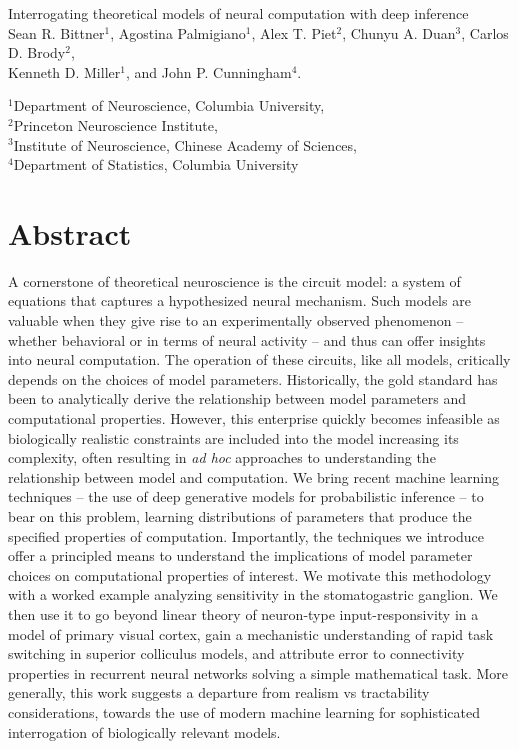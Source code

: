 \documentclass[11pt]{article}
\begin{document}
\medskip                        %

\thispagestyle{plain}
{\Large Interrogating theoretical models of neural computation with deep inference} \\
Sean R. Bittner$^{1}$, Agostina Palmigiano$^{1}$, Alex T. Piet$^{2}$, Chunyu A. Duan$^{3}$, Carlos D. Brody$^{2}$, \\
Kenneth D. Miller$^{1}$, and John P. Cunningham$^{4}$.

{\small
$^{1}$Department of Neuroscience, Columbia University, \\
$^{2}$Princeton Neuroscience Institute, \\
$^{3}$Institute of Neuroscience, Chinese Academy of Sciences, \\
$^{4}$Department of Statistics, Columbia University
}

\linenumbers
\section{Abstract}
A cornerstone of theoretical neuroscience is the circuit model: a system of equations that captures a hypothesized neural mechanism.  
Such models are valuable when they give rise to an experimentally observed phenomenon -- whether behavioral or in terms of neural activity -- and thus can offer insights into neural computation.
The operation of these circuits, like all models, critically depends on the choices of model parameters.
Historically, the gold standard has been to analytically derive the relationship between model parameters and computational properties.  
However, this enterprise quickly becomes infeasible as biologically realistic constraints are included into the model increasing its complexity, often resulting in \emph{ad hoc} approaches to understanding the relationship between model and computation.  
We bring recent machine learning techniques -- the use of deep generative models for probabilistic inference -- to bear on this problem, learning distributions of parameters that produce the specified properties of computation.   
Importantly, the techniques we introduce offer a principled means to understand the implications of model parameter choices on computational properties of interest.  
We motivate this methodology with a worked example analyzing sensitivity in the stomatogastric ganglion.  
We then use it to go beyond linear theory of neuron-type input-responsivity in a model of primary visual cortex, gain a mechanistic understanding of rapid task switching in superior colliculus models, and attribute error to connectivity properties in recurrent neural networks solving a simple mathematical task. 
More generally, this work suggests a departure from realism vs tractability considerations, towards the use of modern machine learning for sophisticated interrogation of biologically relevant models.
\end{document}
